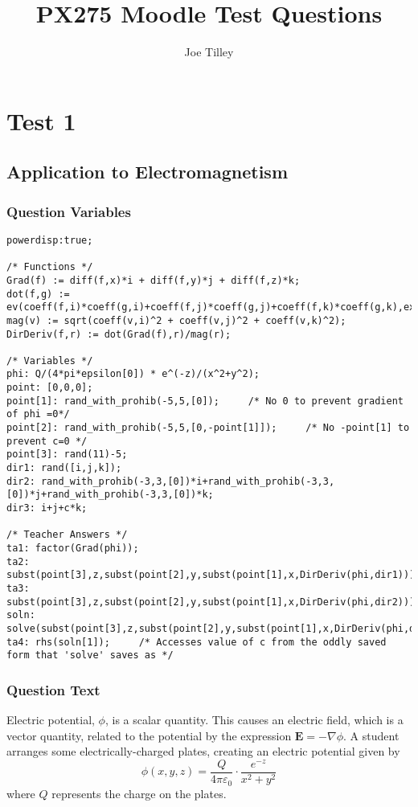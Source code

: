 \documentclass[a4paper,10pt]{article}
\title{PX275 Moodle Test Questions}
\author{Joe Tilley}
\begin{document}
\maketitle
\section{Test 1}
\subsection{Application to Electromagnetism}
\subsubsection{Question Variables}
\begin{lstlisting}
powerdisp:true;

/* Functions */
Grad(f) := diff(f,x)*i + diff(f,y)*j + diff(f,z)*k;
dot(f,g) := ev(coeff(f,i)*coeff(g,i)+coeff(f,j)*coeff(g,j)+coeff(f,k)*coeff(g,k),expand,simp);
mag(v) := sqrt(coeff(v,i)^2 + coeff(v,j)^2 + coeff(v,k)^2);
DirDeriv(f,r) := dot(Grad(f),r)/mag(r);

/* Variables */
phi: Q/(4*pi*epsilon[0]) * e^(-z)/(x^2+y^2);
point: [0,0,0];
point[1]: rand_with_prohib(-5,5,[0]);     /* No 0 to prevent gradient of phi =0*/
point[2]: rand_with_prohib(-5,5,[0,-point[1]]);     /* No -point[1] to prevent c=0 */
point[3]: rand(11)-5;
dir1: rand([i,j,k]);
dir2: rand_with_prohib(-3,3,[0])*i+rand_with_prohib(-3,3,[0])*j+rand_with_prohib(-3,3,[0])*k;
dir3: i+j+c*k;

/* Teacher Answers */
ta1: factor(Grad(phi));
ta2: subst(point[3],z,subst(point[2],y,subst(point[1],x,DirDeriv(phi,dir1))));
ta3: subst(point[3],z,subst(point[2],y,subst(point[1],x,DirDeriv(phi,dir2))));
soln: solve(subst(point[3],z,subst(point[2],y,subst(point[1],x,DirDeriv(phi,dir3))))=0,c)
ta4: rhs(soln[1]);     /* Accesses value of c from the oddly saved form that 'solve' saves as */
\end{lstlisting}
\subsubsection{Question Text}
Electric potential, \(\phi\), is a scalar quantity. This causes an electric field, which is a vector quantity, related to the potential by the expression \(\mathbf{E} = -\nabla \phi\). A student arranges some electrically-charged plates, creating an electric potential given by \[ \phi(x,y,z) = \frac{Q}{4 \pi \varepsilon_{0}} \cdot \frac{e^{-z}}{x^2+y^2} \] where \(Q\) represents the charge on the plates.
\end{document}
